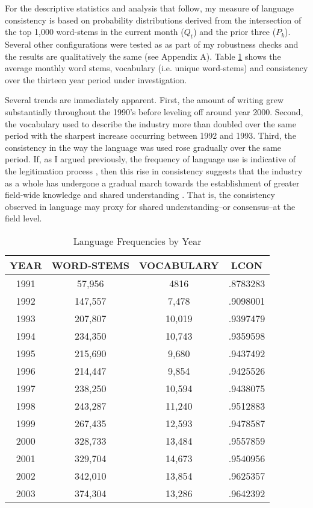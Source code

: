 For the descriptive statistics and analysis that follow, my measure of language consistency is based on probability distributions derived from the intersection of the top 1,000 word-stems in the current month ($Q_t$) and the prior three ($P_k$). Several other configurations were tested as as part of my robustness checks and the results are qualitatively the same (see Appendix A). Table \ref{freq} shows the average monthly word stems, vocabulary (i.e. unique word-stems) and consistency over the thirteen year period under investigation.

Several trends are immediately apparent. First, the amount of writing grew substantially throughout the 1990's before leveling off around year 2000. Second, the vocabulary used to describe the industry more than doubled over the same period with the sharpest increase occurring between 1992 and 1993. Third, the consistency in the way the language was used rose gradually over the same period. If, as I argued previously, the frequency of language use is indicative of the legitimation process \citep[e.g.][]{petkova2014, rosa1999}, then this rise in consistency suggests that the industry as a whole has undergone a gradual march towards the establishment of greater field-wide knowledge and shared understanding \citep{cattani2008}. That is, the consistency observed in language may proxy for shared understanding--or consensus--at the field level.

\begin{table}
\begin{center}
\caption[Language Frequencies by Year]{Language Frequencies by Year \label{freq}}
\vspace{0.3in}
\begin{tabular}{cccc}
\hline 
\hline
YEAR & WORD-STEMS & VOCABULARY & LCON \\
\hline
1991 & 57,956 & 4816 & .8783283 \\
1992	 & 147,557 & 7,478 & .9098001 \\
1993 &  207,807 & 10,019 & .9397479 \\
1994 &  234,350 & 10,743 & .9359598 \\
1995 &  215,690 & 9,680 & .9437492 \\
1996 &  214,447 & 9,854 & .9425526 \\
1997 &  238,250 & 10,594 & .9438075 \\
1998 &  243,287 & 11,240 & .9512883 \\
1999 &  267,435 & 12,593 & .9478587 \\
2000 &  328,733 & 13,484 & .9557859 \\
2001 &  329,704 & 14,673 & .9540956 \\
2002 &  342,010 & 13,854 & .9625357 \\
2003 &  374,304 & 13,286 & .9642392 \\
\hline
\end{tabular}
\end{center}
\end{table}

